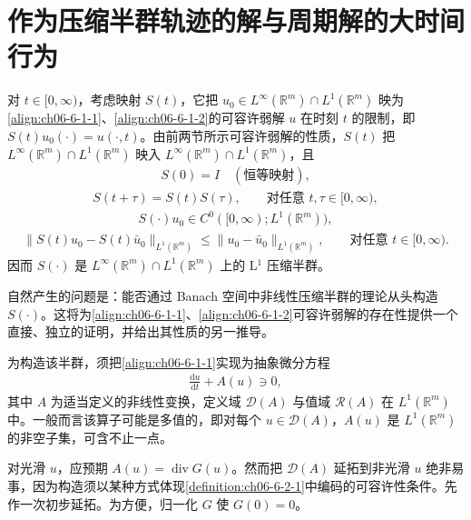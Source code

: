 \documentclass[../../main.tex]{subfiles}
\begin{document}
\section{作为压缩半群轨迹的解与周期解的大时间行为}\label{section:ch06-压缩半群与周期解}

对 $t\in[0,\infty)$，考虑映射 $S(t)$，它把 $u_{0}\in L^{\infty}(\mathbb{R}^{m})\cap L^{1}(\mathbb{R}^{m})$ 映为\eqref{align:ch06-6-1-1}、\eqref{align:ch06-6-1-2}的可容许弱解 $u$ 在时刻 $t$ 的限制，即 $S(t)u_{0}(\cdot)=u(\cdot,t)$。由前两节所示可容许弱解的性质，$S(t)$ 把 $L^{\infty}(\mathbb{R}^{m})\cap L^{1}(\mathbb{R}^{m})$ 映入 $L^{\infty}(\mathbb{R}^{m})\cap L^{1}(\mathbb{R}^{m})$，且
\begin{align}
S(0)=I\quad(\text{恒等映射}),
\label{align:ch06-6-4-1}
\end{align}
\begin{align}
S(t+\tau)=S(t)S(\tau),\qquad\text{对任意 }t,\tau\in[0,\infty),
\label{align:ch06-6-4-2}
\end{align}
\begin{align}
S(\cdot)u_{0}\in C^{0}([0,\infty);L^{1}(\mathbb{R}^{m})),
\label{align:ch06-6-4-3}
\end{align}
\begin{align}
\|S(t)u_{0}-S(t)\bar{u}_{0}\|_{L^{1}(\mathbb{R}^{m})}\leqslant\|u_{0}-\bar{u}_{0}\|_{L^{1}(\mathbb{R}^{m})},\qquad\text{对任意 }t\in[0,\infty).
\label{align:ch06-6-4-4}
\end{align}
因而 $S(\cdot)$ 是 $L^{\infty}(\mathbb{R}^{m})\cap L^{1}(\mathbb{R}^{m})$ 上的 L$^{1}$ 压缩半群。

自然产生的问题是：能否通过 Banach 空间中非线性压缩半群的理论从头构造 $S(\cdot)$。这将为\eqref{align:ch06-6-1-1}、\eqref{align:ch06-6-1-2}可容许弱解的存在性提供一个直接、独立的证明，并给出其性质的另一推导。

为构造该半群，须把\eqref{align:ch06-6-1-1}实现为抽象微分方程
\begin{align}
\frac{\mathrm{d}u}{\mathrm{d}t}+A(u)\ni 0,
\label{align:ch06-6-4-5}
\end{align}
其中 $A$ 为适当定义的非线性变换，定义域 $\mathscr{D}(A)$ 与值域 $\mathscr{R}(A)$ 在 $L^{1}(\mathbb{R}^{m})$ 中。一般而言该算子可能是多值的，即对每个 $u\in\mathscr{D}(A)$，$A(u)$ 是 $L^{1}(\mathbb{R}^{m})$ 的非空子集，可含不止一点。

对光滑 $u$，应预期 $A(u)=\operatorname{div}G(u)$。然而把 $\mathscr{D}(A)$ 延拓到非光滑 $u$ 绝非易事，因为构造须以某种方式体现\cref{definition:ch06-6-2-1}中编码的可容许性条件。先作一次初步延拓。为方便，归一化 $G$ 使 $G(0)=0$。
\end{document}
